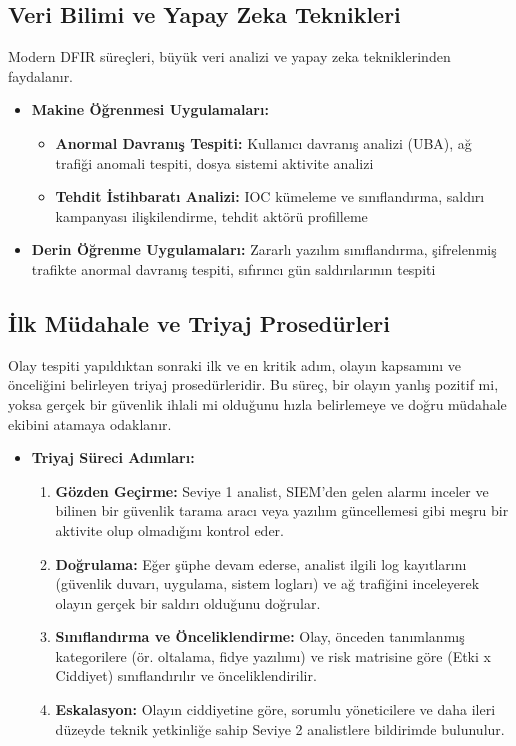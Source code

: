 \begin{itemize}
\begin{itemize}
\subsection{Veri Bilimi ve Yapay Zeka Teknikleri}

Modern DFIR süreçleri, büyük veri analizi ve yapay zeka tekniklerinden faydalanır.

\begin{itemize}
    \item \textbf{Makine Öğrenmesi Uygulamaları:}
    \begin{itemize}
        \item \textbf{Anormal Davranış Tespiti:} Kullanıcı davranış analizi (UBA), ağ trafiği anomali tespiti, dosya sistemi aktivite analizi
        \item \textbf{Tehdit İstihbaratı Analizi:} IOC kümeleme ve sınıflandırma, saldırı kampanyası ilişkilendirme, tehdit aktörü profilleme
    \end{itemize}

    \item \textbf{Derin Öğrenme Uygulamaları:} Zararlı yazılım sınıflandırma, şifrelenmiş trafikte anormal davranış tespiti, sıfırıncı gün saldırılarının tespiti
\end{itemize}

\subsection{İlk Müdahale ve Triyaj Prosedürleri}

Olay tespiti yapıldıktan sonraki ilk ve en kritik adım, olayın kapsamını ve önceliğini belirleyen triyaj prosedürleridir. Bu süreç, bir olayın yanlış pozitif mi, yoksa gerçek bir güvenlik ihlali mi olduğunu hızla belirlemeye ve doğru müdahale ekibini atamaya odaklanır.

\begin{itemize}
    \item \textbf{Triyaj Süreci Adımları:}
    \begin{enumerate}
        \item \textbf{Gözden Geçirme:} Seviye 1 analist, SIEM'den gelen alarmı inceler ve bilinen bir güvenlik tarama aracı veya yazılım güncellemesi gibi meşru bir aktivite olup olmadığını kontrol eder.
        \item \textbf{Doğrulama:} Eğer şüphe devam ederse, analist ilgili log kayıtlarını (güvenlik duvarı, uygulama, sistem logları) ve ağ trafiğini inceleyerek olayın gerçek bir saldırı olduğunu doğrular.
        \item \textbf{Sınıflandırma ve Önceliklendirme:} Olay, önceden tanımlanmış kategorilere (ör. oltalama, fidye yazılımı) ve risk matrisine göre (Etki x Ciddiyet) sınıflandırılır ve önceliklendirilir.
        \item \textbf{Eskalasyon:} Olayın ciddiyetine göre, sorumlu yöneticilere ve daha ileri düzeyde teknik yetkinliğe sahip Seviye 2 analistlere bildirimde bulunulur.
    \end{enumerate}
\end{itemize}


\end{itemize}
\end{itemize}
